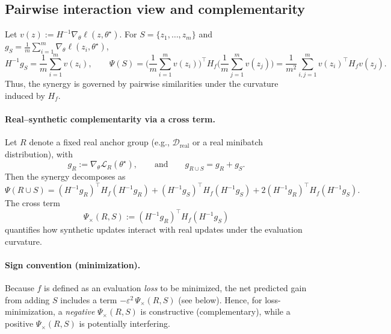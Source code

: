 \documentclass{article}
\theoremstyle{plain}
\theoremstyle{definition}
\theoremstyle{remark}
\begin{document}
\subsection{Pairwise interaction view and complementarity}
Let $v(z) := H^{-1}\nabla_\theta \ell(z,\theta^\star)$.
For $S=\{z_1,\dots,z_m\}$ and $g_S=\frac{1}{m}\sum_{i=1}^m \nabla_\theta \ell(z_i,\theta^\star)$,
\[
H^{-1}g_S = \frac{1}{m}\sum_{i=1}^m v(z_i),
\qquad
\Psi(S)
=
\Big(\frac{1}{m}\sum_{i=1}^m v(z_i)\Big)^\top
H_f
\Big(\frac{1}{m}\sum_{j=1}^m v(z_j)\Big)
=
\frac{1}{m^2}\sum_{i,j=1}^m v(z_i)^\top H_f v(z_j).
\]
Thus, the synergy is governed by pairwise similarities under the curvature induced by $H_f$.

\paragraph{Real--synthetic complementarity via a cross term.}
Let $R$ denote a fixed real anchor group (e.g., $\mathcal{D}_{\mathrm{real}}$ or a real minibatch distribution),
with
\[
g_R := \nabla_\theta \mathcal{L}_{R}(\theta^\star), \qquad
\text{and}\qquad
g_{R\cup S} = g_R + g_S.
\]
Then the synergy decomposes as
\begin{equation}
\Psi(R\cup S)
=
(H^{-1}g_R)^\top H_f (H^{-1}g_R)
+
(H^{-1}g_S)^\top H_f (H^{-1}g_S)
+
2(H^{-1}g_R)^\top H_f (H^{-1}g_S).
\label{eq:cross_decomp}
\end{equation}
The cross term
\[
\Psi_{\times}(R,S) := (H^{-1}g_R)^\top H_f (H^{-1}g_S)
\]
quantifies how synthetic updates interact with real updates under the evaluation curvature.

\paragraph{Sign convention (minimization).}
Because $f$ is defined as an evaluation \emph{loss} to be minimized, the net predicted gain from adding $S$
includes a term $-\varepsilon^2\,\Psi_{\times}(R,S)$ (see below).
Hence, for loss-minimization, a \emph{negative} $\Psi_{\times}(R,S)$ is constructive (complementary),
while a positive $\Psi_{\times}(R,S)$ is potentially interfering.
\end{document}
